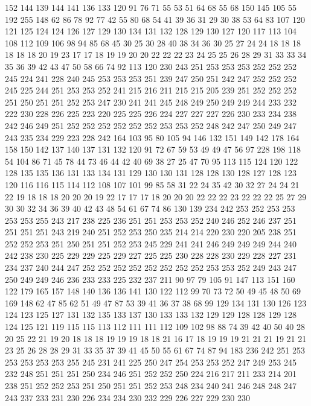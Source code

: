 152 144 139 144 141 136 133 120 91 76 71 55 53 51 64 68 55 68 150 145
105 55 192 255 148 62 86 78 92 77 42 55 80 68 54 41 39 36 31 29
30 38 53 64 83 107 120 121 125 124 124 126 127 129 130 134 131 132 128 129
130 127 120 117 113 104 108 112 109 106 98 94 85 68 45 30 25 30 28 40
38 34 36 30 25 27 24 24 18 18 18 18 18 18 20 19 23 17 17 18
19 19 20 20 22 22 22 23 24 25 25 26 28 29 31 33 33 34 35 36
39 42 43 47 50 58 66 74 92 113 120 230 243 251 253 253 253 252 252 252
245 224 241 228 240 245 253 253 253 251 239 247 250 251 242 247 252 252 252 245
225 244 251 253 253 252 241 215 216 211 215 215 205 239 251 252 252 252 251 250
251 251 252 253 247 230 241 241 245 248 249 250 249 249 244 233 232 222 230 228
226 225 223 220 225 225 226 224 227 227 227 226 230 233 234 238 242 246 249 251
252 252 252 252 252 252 253 253 252 248 242 247 250 249 247 243 235 234 229 223
228 242 164 103 95 80 105 94 146 132 151 149 142 178 164 158 150 142 137 140
137 131 132 120 91 72 67 59 53 49 49 47 56 97 228 198 118 54 104 86
71 45 78 44 73 46 44 42 40 69 38 27 25 47 70 95 113 115 124 120
122 128 135 135 136 131 133 134 131 129 130 130 131 128 128 130 128 127 128 123
120 116 116 115 114 112 108 107 101 99 85 58 31 22 24 35 42 30 32 27
24 24 21 22 19 18 18 18 20 20 20 19 22 17 17 17 18 20 20 20
22 22 22 23 22 22 22 25 27 29 30 30 32 34 36 39 40 42 43 48
54 61 67 74 86 130 139 234 242 253 252 253 253 253 253 255 243 217 238 225
236 251 251 253 253 252 240 246 252 246 237 251 251 251 251 243 219 240 251 252
253 250 235 214 214 220 230 220 205 238 251 252 252 253 251 250 251 251 252 253
245 229 241 241 246 249 249 249 244 240 242 238 230 225 229 229 225 229 227 225
225 230 228 228 230 229 228 227 231 234 237 240 244 247 252 252 252 252 252 252
252 252 253 253 252 249 243 247 250 249 249 246 236 233 233 225 232 237 211 90
97 79 105 91 147 113 151 160 122 179 165 157 148 140 136 136 141 130 122 112
99 70 73 72 50 49 45 48 50 69 169 148 62 47 85 62 51 49 47 87
53 39 41 36 37 38 68 99 129 134 131 130 126 123 124 123 125 127 131 132
135 133 137 130 133 133 132 129 129 128 128 129 128 124 125 121 119 115 115 113
112 111 111 112 109 102 98 88 74 39 42 40 50 40 28 20 25 22 21 19
20 18 18 18 19 19 19 18 18 21 16 17 18 19 19 19 21 21 21 19
21 21 23 25 26 28 28 29 31 33 35 37 39 41 45 50 55 61 67 74
87 94 183 236 242 251 253 253 253 253 253 255 245 231 241 225 250 247 254 253
253 252 247 249 253 245 232 248 251 251 251 250 234 246 251 252 252 250 224 216
217 211 233 214 201 238 251 252 252 253 251 250 251 251 252 253 248 234 240 241
246 248 248 247 243 237 233 231 230 226 234 234 230 232 229 226 227 229 230 230
